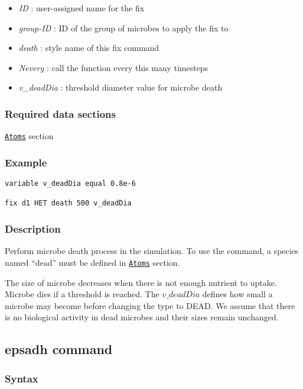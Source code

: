 \documentclass[11pt,a4paper,openright]{article}
\begin{document}
\begin{itemize}  [nosep]
\item
	{\it ID }: user-assigned name for the fix
\item
	{\it group-ID }: ID of the group of microbes to apply the fix to
\item
	{\it death }: style name of this fix command
\item
	{\it Nevery }: call the function every this many timesteps
\item
	{\it v\_deadDia }: threshold diameter value for microbe death

\end{itemize}

\subsubsection*{Required data sections} 
\hyperref[satom]{\tt Atoms} section


\subsubsection*{Example}

\begin{Verbatim}[frame=single]
variable v_deadDia equal 0.8e-6
    
fix d1 HET death 500 v_deadDia
\end{Verbatim}

\subsubsection*{Description}

Perform microbe death process in the simulation. To use the command, a species named ``dead'' must be defined in 
\hyperref[satom]{\tt Atoms} section.

The size of microbe decreases when there is not enough nutrient to uptake. Microbe dies if a threshold is reached. The $v\_deadDia$ defines how small a microbe may become before changing the type to DEAD. We assume that there is no biological activity in dead microbes and their sizes remain unchanged. 

\newpage
\subsection{epsadh command}
\label{epsadh}
\subsubsection*{Syntax}
\end{document}
